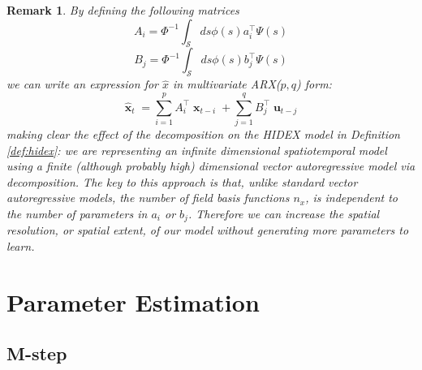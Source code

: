 \documentclass{IEEEtran}
\DeclareMathOperator{\xvec}{\mathbf{x}}
\DeclareMathOperator{\uvec}{\mathbf{u}}
\newtheorem{remark}{Remark}
\begin{document}
\begin{remark}
	By defining the following matrices
	\begin{equation}
		A_i = \Phi^{-1} \int_\mathcal{S}ds \phi(s) a_i^\top \Psi(s)
	\end{equation}
	\begin{equation}
		B_j = \Phi^{-1} \int_\mathcal{S}ds \phi(s) b_j^\top \Psi(s)
	\end{equation}
	we can write an expression for $\hat{x}$ in multivariate ARX($p,q$) \cite{Ljung} form:
	\begin{equation}
		\hat{\xvec}_t = \sum_{i=1}^{p} A_i^\top \xvec_{t-i} +  \sum_{j=1}^{q} B_j^\top \uvec_{t-j}
	\end{equation}
	making clear the effect of the decomposition on the HIDEX model in Definition \ref{def:hidex}: we are representing an infinite dimensional spatiotemporal model using a finite (although probably high) dimensional vector autoregressive model via decomposition. The key to this approach is that, unlike standard vector autoregressive models, the number of field basis functions $n_x$, is independent to the number of parameters in $a_i$ or $b_j$. Therefore we can increase the spatial resolution, or spatial extent, of our model without generating more parameters to learn.
\end{remark}

\section{Parameter Estimation}

\subsection{M-step}
\end{document}
